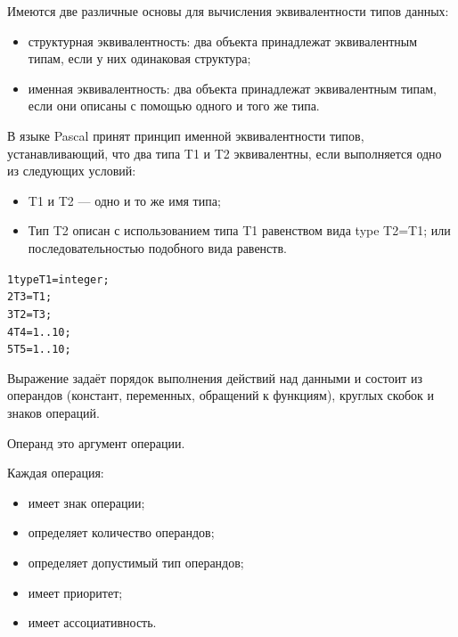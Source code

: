 \documentclass{beamer}
\begin{document}
\begin{frame}[fragile]
Имеются две различные основы для вычисления эквивалентности типов данных:
\begin{itemize}
\item структурная эквивалентность: два объекта принадлежат эквивалентным типам, если у них одинаковая структура;
\item именная эквивалентность: два объекта принадлежат эквивалентным типам, если они описаны с помощью одного и того же типа.
\end{itemize}

В языке Pascal принят принцип именной эквивалентности типов, устанавливающий, что два типа T1 и T2 эквивалентны, если выполняется одно из следующих условий:
\begin{itemize}
\item T1 и T2 — одно и то же имя типа;
\item Тип T2 описан с использованием типа T1 равенством вида type T2=T1; или последовательностью подобного вида равенств.
\end{itemize}
\begin{alltt}
1  type T1 = integer;
2    T3 = T1;
3    T2 = T3;
4    T4 = 1..10;
5    T5 = 1..10; 	
\end{alltt}
\end{frame}   

\begin{frame}
\begin{block}{Выражение}
задаёт порядок выполнения действий над данными и состоит из операндов (констант, переменных, обращений к функциям), круглых скобок и знаков операций.
\end{block}
\begin{block}{Операнд}
это аргумент операции.
\end{block}
Каждая операция:
\begin{itemize}
\item имеет знак операции;
\item определяет количество операндов;
\item определяет допустимый тип операндов;
\item имеет приоритет;
\item имеет ассоциативность.
\end{itemize}
\end{frame}
\end{document}
